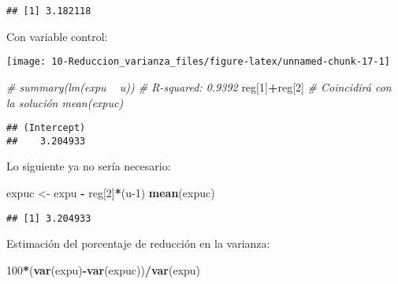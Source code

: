 \documentclass[
]{book}
\newenvironment{Shaded}{\begin{snugshade}}{\end{snugshade}}
\newcommand{\CommentTok}[1]{\textcolor[rgb]{0.56,0.35,0.01}{\textit{#1}}}
\newcommand{\DataTypeTok}[1]{\textcolor[rgb]{0.13,0.29,0.53}{#1}}
\newcommand{\DecValTok}[1]{\textcolor[rgb]{0.00,0.00,0.81}{#1}}
\newcommand{\KeywordTok}[1]{\textcolor[rgb]{0.13,0.29,0.53}{\textbf{#1}}}
\newcommand{\NormalTok}[1]{#1}
\newcommand{\OperatorTok}[1]{\textcolor[rgb]{0.81,0.36,0.00}{\textbf{#1}}}
\newcommand{\StringTok}[1]{\textcolor[rgb]{0.31,0.60,0.02}{#1}}
\theoremstyle{break}
\theoremstyle{definition}
\theoremstyle{definition}
\theoremstyle{definition}
\theoremstyle{remark}
\begin{document}
\begin{verbatim}
## [1] 3.182118
\end{verbatim}

Con variable control:

\begin{Shaded}
\end{Shaded}

\begin{center}\texttt{[image: 10-Reduccion\_varianza\_files/figure-latex/unnamed-chunk-17-1]} \end{center}

\begin{Shaded}
\begin{Highlighting}[]
\CommentTok{# summary(lm(expu ~ u)) # R-squared: 0.9392}
\NormalTok{reg[}\DecValTok{1}\NormalTok{]}\OperatorTok{+}\NormalTok{reg[}\DecValTok{2}\NormalTok{] }\CommentTok{# Coincidirá con la solución mean(expuc)}
\end{Highlighting}
\end{Shaded}

\begin{verbatim}
## (Intercept) 
##    3.204933
\end{verbatim}

Lo siguiente ya no sería necesario:

\begin{Shaded}
\begin{Highlighting}[]
\NormalTok{expuc <-}\StringTok{ }\NormalTok{expu }\OperatorTok{-}\StringTok{ }\NormalTok{reg[}\DecValTok{2}\NormalTok{]}\OperatorTok{*}\NormalTok{(u}\DecValTok{-1}\NormalTok{)}
\KeywordTok{mean}\NormalTok{(expuc)  }
\end{Highlighting}
\end{Shaded}

\begin{verbatim}
## [1] 3.204933
\end{verbatim}

Estimación del porcentaje de reducción en la varianza:

\begin{Shaded}
\begin{Highlighting}[]
\DecValTok{100}\OperatorTok{*}\NormalTok{(}\KeywordTok{var}\NormalTok{(expu)}\OperatorTok{-}\KeywordTok{var}\NormalTok{(expuc))}\OperatorTok{/}\KeywordTok{var}\NormalTok{(expu)}
\end{Highlighting}
\end{Shaded}
\end{document}
